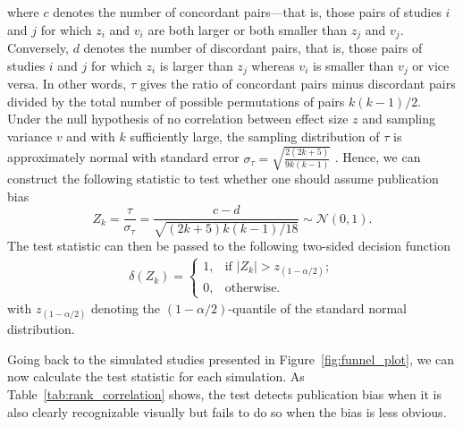 where $c$ denotes the number of concordant pairs—that is, those pairs of studies $i$ and $j$ for which $z_i$ and $v_i$ are both larger or both smaller than $z_j$ and $v_j$. Conversely, $d$ denotes the number of discordant pairs, that is, those pairs of studies $i$ and $j$ for which $z_i$ is larger than $z_j$ whereas $v_i$ is smaller than $v_j$ or vice versa. In other words, $\tau$ gives the ratio of concordant pairs minus discordant pairs divided by the total number of possible permutations of pairs $k(k-1)/2$. Under the null hypothesis of no correlation between effect size $z$ and sampling variance $v$ and with $k$ sufficiently large, the sampling distribution of $\tau$ is approximately normal with standard error $\sigma_{\tau} = \sqrt{\frac{2(2k+5)}{9k(k-1)}}$ \citep{kendall_new_1938}. Hence, we can construct the following statistic to test whether one should assume publication bias
$$Z_k = \frac{\tau}{\sigma_{\tau}} = \frac{c-d}{\sqrt{(2k+5)k(k-1)/18}} \sim \mathcal{N}(0,1).$$
The test statistic can then be passed to the following two-sided decision function
\begin{align*}
    \delta(Z_k) = \begin{cases} 1, & \text{if } |Z_k| > z_{(1-\alpha/2)}; \\ 0, & \mbox{otherwise}.\end{cases}
\end{align*}
with $z_{(1-\alpha/2)}$ denoting the $(1-\alpha/2)$-quantile of the standard normal distribution.\par
Going back to the simulated studies presented in Figure~\ref{fig:funnel_plot}, we can now calculate the test statistic for each simulation. As Table~\ref{tab:rank_correlation} shows, the test detects publication bias when it is also clearly recognizable visually but fails to do so when the bias is less obvious.\par
